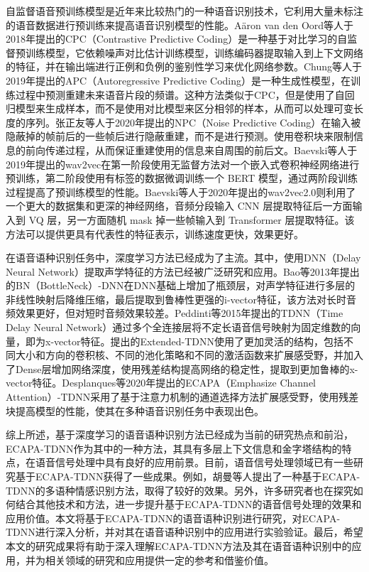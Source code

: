 自监督语音预训练模型是近年来比较热门的一种语音识别技术，它利用大量未标注的语音数据进行预训练来提高语音识别模型的性能。Aäron van den Oord等人于2018年提出的CPC（Contrastive Predictive Coding）是一种基于对比学习的自监督预训练模型，它依赖噪声对比估计训练模型，训练编码器提取输入到上下文网络的特征，并在输出端进行正例和负例的鉴别性学习来优化网络参数。Chung等人于2019年提出的APC（Autoregressive Predictive Coding）是一种生成性模型，在训练过程中预测重建未来语音片段的频谱。这种方法类似于CPC，但是使用了自回归模型来生成样本，而不是使用对比模型来区分相邻的样本，从而可以处理可变长度的序列。张正友等人于2020年提出的NPC（Noise Predictive Coding）在输入被隐蔽掉的帧前后的一些帧后进行隐蔽重建，而不是进行预测。使用卷积块来限制信息的前向传递过程，从而保证重建使用的信息来自周围的前后文。Baevski等人于2019年提出的wav2vec在第一阶段使用无监督方法对一个嵌入式卷积神经网络进行预训练，第二阶段使用有标签的数据微调训练一个 BERT 模型，通过两阶段训练过程提高了预训练模型的性能。Baevski等人于2020年提出的wav2vec2.0则利用了一个更大的数据集和更深的神经网络，音频分段输入 CNN 层提取特征后一方面输入到 VQ 层，另一方面随机 mask 掉一些帧输入到 Transformer 层提取特征。该方法可以提供更具有代表性的特征表示，训练速度更快，效果更好。

在语音语种识别任务中，深度学习方法已经成为了主流。其中，使用DNN（Delay Neural Network）提取声学特征的方法已经被广泛研究和应用。Bao等2013年提出的BN（BottleNeck）-DNN在DNN基础上增加了瓶颈层，对声学特征进行多层的非线性映射后降维压缩，最后提取到鲁棒性更强的i-vector特征，该方法对长时音频效果更好，但对短时音频效果较差。Peddinti等2015年提出的TDNN（Time Delay Neural Network）通过多个全连接层将不定长语音信号映射为固定维数的向量，即为x-vector特征。提出的Extended-TDNN使用了更加灵活的结构，包括不同大小和方向的卷积核、不同的池化策略和不同的激活函数来扩展感受野，并加入了Dense层增加网络深度，使用残差结构提高网络的稳定性，提取到更加鲁棒的x-vector特征。Desplanques等2020年提出的ECAPA（Emphasize Channel Attention）-TDNN采用了基于注意力机制的通道选择方法扩展感受野，使用残差块提高模型的性能，使其在多种语音识别任务中表现出色。

综上所述，基于深度学习的语音语种识别方法已经成为当前的研究热点和前沿，ECAPA-TDNN作为其中的一种方法，其具有多层上下文信息和金字塔结构的特点，在语音信号处理中具有良好的应用前景。目前，语音信号处理领域已有一些研究基于ECAPA-TDNN获得了一些成果。例如，胡曼等人提出了一种基于ECAPA-TDNN的多语种情感识别方法，取得了较好的效果。另外，许多研究者也在探究如何结合其他技术和方法，进一步提升基于ECAPA-TDNN的语音信号处理的效果和应用价值。本文将基于ECAPA-TDNN的语音语种识别进行研究，对ECAPA-TDNN进行深入分析，并对其在语音语种识别中的应用进行实验验证。最后，希望本文的研究成果将有助于深入理解ECAPA-TDNN方法及其在语音语种识别中的应用，并为相关领域的研究和应用提供一定的参考和借鉴价值。

